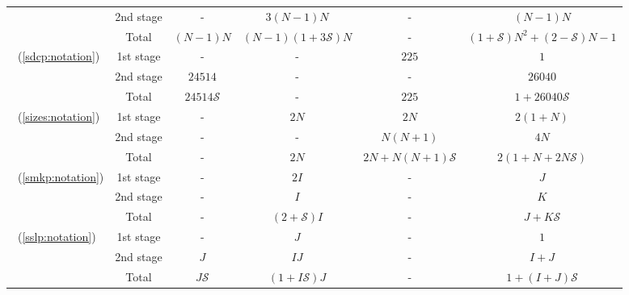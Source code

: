 \begin{table}[H]
{\begin{threeparttable}
\begin{tabular}{@{}lccccc@{}}
				& 2nd stage & -              & $3(N-1)N$                            & -                    & $(N-1)N$                     \\ \cmidrule(l){2-6} 
				& Total          & $(N-1)N$          & $(N-1)(1+3\mathcal{S})N$              & -                    & $(1+\mathcal{S})N^2+(2-\mathcal{S})N-1$ \\ \midrule
				\multirow{3}{*}{\sdcp\ (\ref{sdcp:notation})}  & 1st stage & -              & -                               & $225$                  & $1$                  \\
				& 2nd stage & $24514$              & -                                  & -             & $26040$                     \\ \cmidrule(l){2-6} 
				& Total          & $24514\mathcal{S}$              & -                               & $225$ & $1+26040\mathcal{S}$    \\ \midrule
				\multirow{3}{*}{\sizes\ (\ref{sizes:notation})}  & 1st stage & -              & $2N$                               & $2N$                 & $2(1+N)$                  \\
				& 2nd stage & -              & -                                  & $N(N+1)$              & $4N$                     \\ \cmidrule(l){2-6} 
				& Total          & -              & $2N$                               & $2N+N(N+1)\mathcal{S}$ & $2(1+N+2N\mathcal{S})$    \\ \midrule
				\multirow{3}{*}{\smkp\ (\ref{smkp:notation})}   & 1st stage & -              & $2I$                               & -                    & $J$                       \\
				& 2nd stage & -              & $I$                                & -                    & $K$                       \\ \cmidrule(l){2-6} 
				& Total          & -              & $(2+\mathcal{S})I$                 & -                    & $J+K\mathcal{S}$          \\ \midrule
				\multirow{3}{*}{\sslp\ (\ref{sslp:notation})}   & 1st stage & -              & $J$                                & -                    & $1$                       \\
				& 2nd stage & $J$            & $IJ$                               & -                    & $I+J$                     \\ \cmidrule(l){2-6} 
				& Total          & $J\mathcal{S}$ & $(1+I\mathcal{S})J$                & -                    & $1+(I+J)\mathcal{S}$      \\ \midrule

\end{tabular}
\end{threeparttable}}
\end{table}
